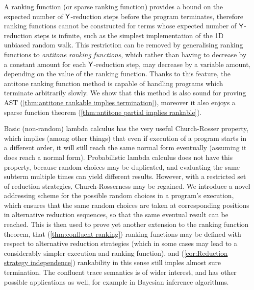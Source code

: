 A ranking function (or sparse ranking function) provides a bound on the expected number of $\mathsf{Y}$-reduction steps before the program terminates, therefore ranking functions cannot be constructed for terms whose expected number of $\mathsf{Y}$-reduction steps is infinite, such as the simplest implementation of the 1D unbiased random walk. 
This restriction can be removed by generalising ranking functions to \emph{antitone ranking functions}, which rather than having to decrease by a constant amount for each $\mathsf{Y}$-reduction step, may decrease by a variable amount, depending on the value of the ranking function. 
Thanks to this feature, the antitone ranking function method is capable of handling programs which terminate arbitrarily slowly. 
We show that this method is also sound for proving AST (\cref{thm:antitone rankable implies termination}), 
moreover it also enjoys a sparse function theorem (\cref{thm:antitone partial implies rankable}).

Basic (non-random) lambda calculus has the very useful Church-Rosser property, which implies (among other things) that even if execution of a program starts in a different order, it will still reach the same normal form eventually (assuming it does reach a normal form). 
Probabilistic lambda calculus does not have this property, because random choices may be duplicated, and evaluating the same subterm multiple times can yield different results. 
However, with a restricted set of reduction strategies, Church-Rosserness may be regained. 
We introduce a novel addressing scheme for the possible random choices in a program's execution, which ensures that the same random choices are taken at corresponding positions in alternative reduction sequences, so that the same eventual result can be reached. 
This is then used to prove yet another extension to the ranking function theorem, that (\cref{thm:confluent ranking}) ranking functions may be defined with respect to alternative reduction strategies (which in some cases may lead to a considerably simpler execution and ranking function), and (\cref{cor:Reduction strategy independence}) rankability in this sense still imples almost sure termination. 
The confluent trace semantics is of wider interest, and has other possible applications as well, for example in Bayesian inference algorithms.

